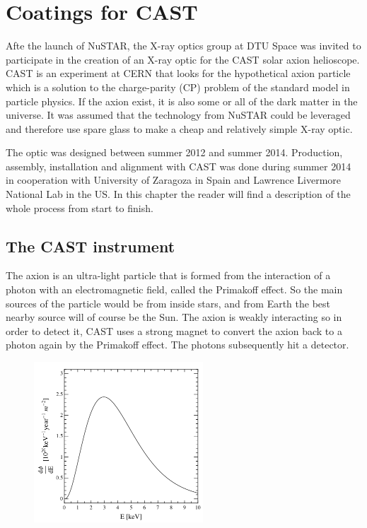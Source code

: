 \chapter{Coatings for CAST}
Afte the launch of NuSTAR, the X-ray optics group at DTU Space was invited to participate in the creation of an X-ray optic for the CAST solar axion helioscope. CAST is an experiment at CERN that looks for the hypothetical axion particle which is a solution to the charge-parity (CP) problem of the standard model in particle physics. If the axion exist, it is also some or all of the dark matter in the universe. It was assumed that the technology from NuSTAR could be leveraged and therefore use spare glass to make a cheap and relatively simple X-ray optic.

The optic was designed between summer 2012 and summer 2014. Production, assembly, installation and alignment with CAST was done during summer 2014 in cooperation with University of Zaragoza in Spain and Lawrence Livermore National Lab in the US. In this chapter the reader will find a description of the whole process from start to finish.

\section{The CAST instrument}

The axion is an ultra-light particle that is formed from the interaction of a photon with an electromagnetic field, called the Primakoff effect. So the main sources of the particle would be from inside stars, and from Earth the best nearby source will of course be the Sun. The axion is weakly interacting so in order to detect it, CAST uses a strong magnet to convert the axion back to a photon again by the Primakoff effect. The photons subsequently hit a detector.

\begin{figure}[htbp]
  \centering
    \includegraphics[height=6cm]{figures/cast/axion_spectrum.png}
  \caption{}
  \label{fig:axion_spectrum}
\end{figure}

